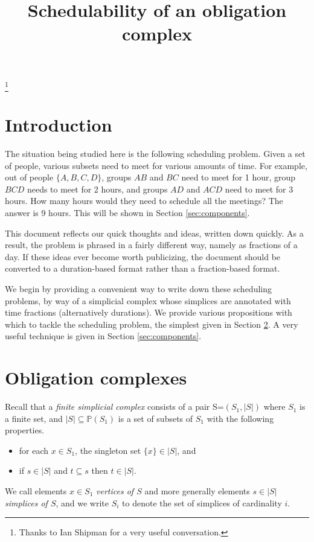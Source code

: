 \documentclass{amsart}
\def\PP{{\mathbb P}}
\def\ss{\subseteq}
\theoremstyle{remark}
\theoremstyle{definition}
\begin{document}
\title{Schedulability of an obligation complex}

\thanks{Thanks to Ian Shipman for a very useful conversation.}

\maketitle

\section{Introduction}

The situation being studied here is the following scheduling problem. Given a set of people, various subsets need to meet for various amounts of time. For example, out of people $\{A,B,C,D\}$, groups $AB$ and $BC$ need to meet for 1 hour, group $BCD$ needs to meet for 2 hours, and groups $AD$ and $ACD$ need to meet for 3 hours. How many hours would they need to schedule all the meetings? The answer is 9 hours. This will be shown in Section \ref{sec:components}.

This document reflects our quick thoughts and ideas, written down quickly. As a result, the problem is phrased in a fairly different way, namely as fractions of a day. If these ideas ever become worth publicizing, the document should be converted to a duration-based format rather than a fraction-based format.

We begin by providing a convenient way to write down these scheduling problems, by way of a simplicial complex whose simplices are annotated with time fractions (alternatively durations). We provide various propositions with which to tackle the scheduling problem, the simplest given in Section \ref{sec:obligations}. A very useful technique is given in Section \ref{sec:components}.

\section{Obligation complexes}\label{sec:obligations}

Recall that a {\em finite simplicial complex} consists of a pair S=$(S_1,|S|)$ where $S_1$ is a finite set, and $|S|\ss\PP(S_1)$ is a set of subsets of $S_1$ with the following properties. \begin{itemize}\item for each $x\in S_1$, the singleton set $\{x\}\in|S|$, and \item if $s\in|S|$ and $t\ss s$ then $t\in|S|$.\end{itemize} We call elements $x\in S_1$  {\em vertices of $S$} and more generally elements $s\in |S|$ {\em simplices of $S$}, and we write $S_i$ to denote the set of simplices of cardinality $i$.
\end{document}

